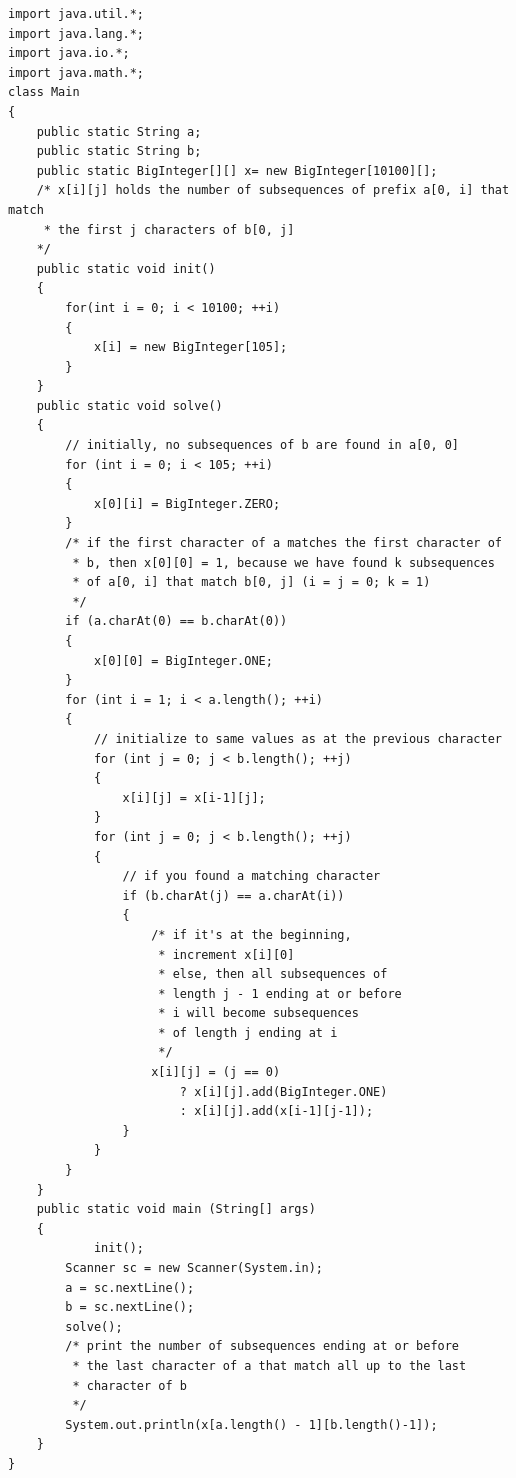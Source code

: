 \documentclass[12pt]{book}
\begin{document}
\begin{verbatim}
import java.util.*;
import java.lang.*;
import java.io.*;
import java.math.*;
class Main
{
	public static String a;
	public static String b;
	public static BigInteger[][] x= new BigInteger[10100][];
	/* x[i][j] holds the number of subsequences of prefix a[0, i] that match
	 * the first j characters of b[0, j]
	*/
	public static void init()
	{
		for(int i = 0; i < 10100; ++i)
		{
			x[i] = new BigInteger[105];
		}
	}
	public static void solve()
	{
		// initially, no subsequences of b are found in a[0, 0]
		for (int i = 0; i < 105; ++i)
		{
			x[0][i] = BigInteger.ZERO;
		}
		/* if the first character of a matches the first character of
		 * b, then x[0][0] = 1, because we have found k subsequences
		 * of a[0, i] that match b[0, j] (i = j = 0; k = 1)
		 */
		if (a.charAt(0) == b.charAt(0))
		{
			x[0][0] = BigInteger.ONE;
		}
		for (int i = 1; i < a.length(); ++i)
		{
			// initialize to same values as at the previous character
			for (int j = 0; j < b.length(); ++j)
			{
				x[i][j] = x[i-1][j];
			}
			for (int j = 0; j < b.length(); ++j)
			{
				// if you found a matching character
				if (b.charAt(j) == a.charAt(i))
				{
					/* if it's at the beginning,
					 * increment x[i][0]
					 * else, then all subsequences of
					 * length j - 1 ending at or before
					 * i will become subsequences
					 * of length j ending at i
					 */
					x[i][j] = (j == 0)
						? x[i][j].add(BigInteger.ONE)
						: x[i][j].add(x[i-1][j-1]);
				}
			}
		}
	}
	public static void main (String[] args)
	{
			init();
		Scanner sc = new Scanner(System.in);
		a = sc.nextLine();
		b = sc.nextLine();
		solve();
		/* print the number of subsequences ending at or before
		 * the last character of a that match all up to the last
		 * character of b
		 */
		System.out.println(x[a.length() - 1][b.length()-1]);
	}
}
\end{verbatim}
\end{document}
